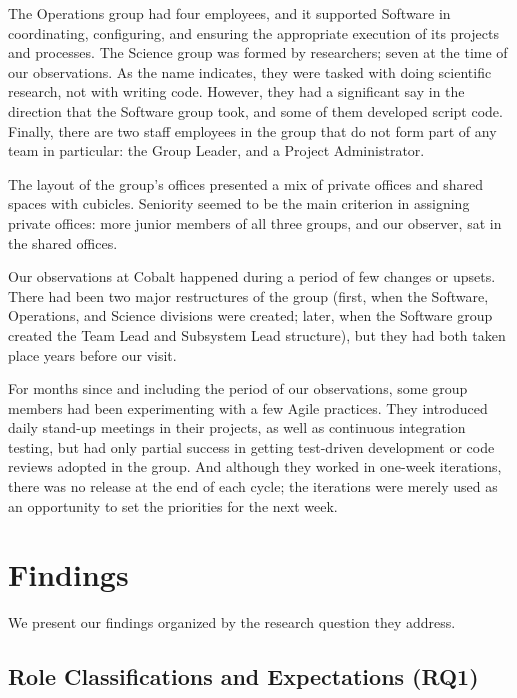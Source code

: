 \documentclass[10pt, conference, compsocconf]{IEEEtran}
\begin{document}
The Operations group had four employees, and it supported Software in coordinating, configuring, and ensuring the appropriate execution of its projects and processes. The Science group was formed by researchers; seven at the time of our observations. As the name indicates, they were tasked with doing scientific research, not with writing code. However, they had a significant say in the direction that the Software group took, and some of them developed script code. Finally, there are two staff employees in the group that do not form part of any team in particular: the Group Leader, and a Project Administrator.

The layout of the group's offices presented a mix of private offices and shared spaces with cubicles. Seniority seemed to be the main criterion in assigning private offices: more junior members of all three groups, and our observer, sat in the shared offices.

Our observations at Cobalt happened during a period of few changes or upsets. There had been two major restructures of the group (first, when the Software, Operations, and Science divisions were created; later, when the Software group created the Team Lead and Subsystem Lead structure), but they had both taken place years before our visit.

For months since and including the period of our observations, some group members had been experimenting with a few Agile practices. They introduced daily stand-up meetings in their projects, as well as continuous integration testing, but had only partial success in getting test-driven development or code reviews adopted in the group. And although they worked in one-week iterations, there was no release at the end of each cycle; the iterations were merely used as an opportunity to set the priorities for the next week.




\section{Findings}

We present our findings organized by the research question they address.




\subsection{Role Classifications and Expectations (RQ1)}
\end{document}
